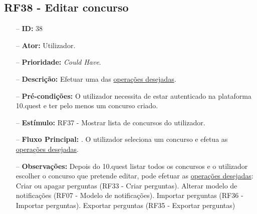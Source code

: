\subsection{RF38 - Editar concurso}
\begin{itemize}
	\item[--] \textbf{ID:} 38
	\item[--]  \textbf{Ator:} Utilizador.
	\item[--]  \textbf{Prioridade:} \textit{Could Have}.
	\item[--]  \textbf{Descrição:} Efetuar uma das \underline{operações desejadas}.
	\item[--]  \textbf{Pré-condições:} O utilizador necessita de estar autenticado na plataforma 10.quest e ter pelo menos um concurso criado.
	\item[--]  \textbf{Estímulo:} RF37 - Mostrar lista de concursos do utilizador.
	\item[--]  \textbf{Fluxo Principal:} 
		. O utilizador seleciona um concurso e efetua as \underline{operações desejadas}.
	\item[--]  \textbf{Observações:} Depois do 10.quest listar todos os concursos e o utilizador escolher o concurso que pretende editar, pode efetuar as \underline{operações desejadas}:
		\subitem Criar ou apagar perguntas (RF33 - Criar perguntas).
		\subitem Alterar modelo de notificações (RF07 - Modelo de notificações).
		\subitem Importar perguntas (RF36 - Importar perguntas).
		\subitem Exportar perguntas (RF35 - Exportar perguntas)
\end{itemize}
\newpage

